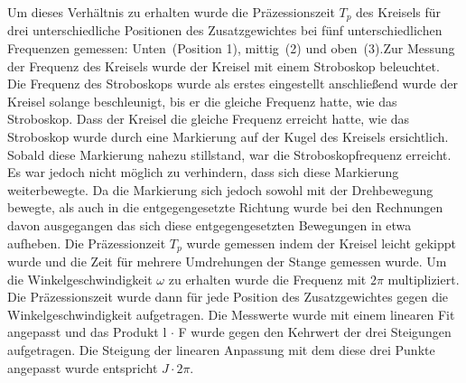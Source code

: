 Um dieses Verhältnis zu erhalten wurde die Präzessionszeit $T_p$ des Kreisels für drei unterschiedliche Positionen des Zusatzgewichtes bei fünf unterschiedlichen Frequenzen gemessen: Unten~(Position 1), mittig~(2) und oben~(3).Zur Messung der Frequenz des Kreisels wurde der Kreisel mit einem Stroboskop beleuchtet. Die Frequenz des Stroboskops wurde als erstes eingestellt anschließend wurde der Kreisel solange beschleunigt, bis er die gleiche Frequenz hatte, wie das Stroboskop.
Dass der Kreisel die gleiche Frequenz erreicht hatte, wie das Stroboskop wurde durch eine Markierung auf der Kugel des Kreisels ersichtlich. Sobald diese Markierung nahezu stillstand, war die Stroboskopfrequenz erreicht. Es war jedoch nicht möglich zu verhindern, dass sich diese Markierung weiterbewegte. Da die Markierung sich jedoch sowohl mit der Drehbewegung bewegte, als auch in die entgegengesetzte Richtung wurde bei den Rechnungen davon ausgegangen das sich diese entgegengesetzten Bewegungen in etwa aufheben. Die Präzessionzeit $T_p$ wurde gemessen indem der Kreisel leicht gekippt wurde und die Zeit für mehrere Umdrehungen der Stange gemessen wurde. Um die Winkelgeschwindigkeit $\omega$ zu erhalten wurde die Frequenz mit $2 \pi$ multipliziert.
Die Präzessionszeit wurde dann für jede Position des Zusatzgewichtes gegen die Winkelgeschwindigkeit aufgetragen. Die Messwerte wurde mit einem linearen Fit angepasst und das Produkt l $\cdot$ F wurde gegen den Kehrwert der drei Steigungen aufgetragen. Die Steigung der linearen Anpassung mit dem diese drei Punkte angepasst wurde entspricht $J \cdot 2 \pi$.